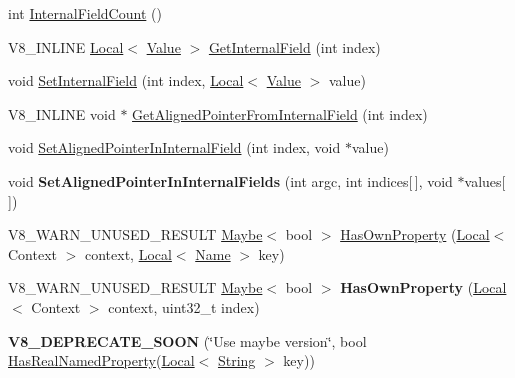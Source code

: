 \begin{DoxyCompactItemize}
\item 
int \mbox{\hyperlink{classv8_1_1Object_aaec28576353eebe6fee113bce2718ecc}{Internal\+Field\+Count}} ()
\item 
V8\+\_\+\+I\+N\+L\+I\+NE \mbox{\hyperlink{classv8_1_1Local}{Local}}$<$ \mbox{\hyperlink{classv8_1_1Value}{Value}} $>$ \mbox{\hyperlink{classv8_1_1Object_aa3324fdf652d8ac3b2f27faa0559231d}{Get\+Internal\+Field}} (int index)
\item 
void \mbox{\hyperlink{classv8_1_1Object_aebf949a0592cebc144bb2f96bfb7ec72}{Set\+Internal\+Field}} (int index, \mbox{\hyperlink{classv8_1_1Local}{Local}}$<$ \mbox{\hyperlink{classv8_1_1Value}{Value}} $>$ value)
\item 
V8\+\_\+\+I\+N\+L\+I\+NE void $\ast$ \mbox{\hyperlink{classv8_1_1Object_a435f68bb7ef0f64dd522c5c910682448}{Get\+Aligned\+Pointer\+From\+Internal\+Field}} (int index)
\item 
void \mbox{\hyperlink{classv8_1_1Object_a0ccba69581f0b5e4e672bab90f26879b}{Set\+Aligned\+Pointer\+In\+Internal\+Field}} (int index, void $\ast$value)
\item 
\mbox{\label{classv8_1_1Object_af03a2f9b898b578048b9e1c313f28100}} 
void {\bfseries Set\+Aligned\+Pointer\+In\+Internal\+Fields} (int argc, int indices\mbox{[}$\,$\mbox{]}, void $\ast$values\mbox{[}$\,$\mbox{]})
\item 
V8\+\_\+\+W\+A\+R\+N\+\_\+\+U\+N\+U\+S\+E\+D\+\_\+\+R\+E\+S\+U\+LT \mbox{\hyperlink{classv8_1_1Maybe}{Maybe}}$<$ bool $>$ \mbox{\hyperlink{classv8_1_1Object_acdd3921e95d5bb1a27cea489792607ff}{Has\+Own\+Property}} (\mbox{\hyperlink{classv8_1_1Local}{Local}}$<$ Context $>$ context, \mbox{\hyperlink{classv8_1_1Local}{Local}}$<$ \mbox{\hyperlink{classv8_1_1Name}{Name}} $>$ key)
\item 
\mbox{\label{classv8_1_1Object_a939ec489799f022f0532835be8355774}} 
V8\+\_\+\+W\+A\+R\+N\+\_\+\+U\+N\+U\+S\+E\+D\+\_\+\+R\+E\+S\+U\+LT \mbox{\hyperlink{classv8_1_1Maybe}{Maybe}}$<$ bool $>$ {\bfseries Has\+Own\+Property} (\mbox{\hyperlink{classv8_1_1Local}{Local}}$<$ Context $>$ context, uint32\+\_\+t index)
\item 
\mbox{\label{classv8_1_1Object_abf24b52a108c801a74718e1a1e64ba5b}} 
{\bfseries V8\+\_\+\+D\+E\+P\+R\+E\+C\+A\+T\+E\+\_\+\+S\+O\+ON} (\char`\"{}Use maybe version\char`\"{}, bool \mbox{\hyperlink{classv8_1_1Object_ad830b937c7586fe2086b288ea79935c4}{Has\+Real\+Named\+Property}}(\mbox{\hyperlink{classv8_1_1Local}{Local}}$<$ \mbox{\hyperlink{classv8_1_1String}{String}} $>$ key))

\end{DoxyCompactItemize}
